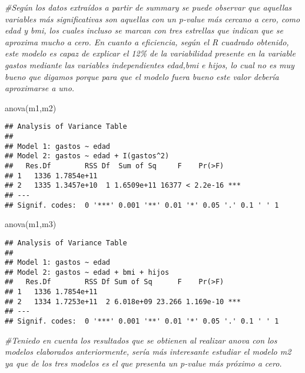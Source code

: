\documentclass[
]{book}
\newenvironment{Shaded}{\begin{snugshade}}{\end{snugshade}}
\newcommand{\CommentTok}[1]{\textcolor[rgb]{0.56,0.35,0.01}{\textit{#1}}}
\newcommand{\FunctionTok}[1]{\textcolor[rgb]{0.00,0.00,0.00}{#1}}
\newcommand{\NormalTok}[1]{#1}
\begin{document}
\begin{Shaded}
\begin{Highlighting}[]
\CommentTok{\#Según los datos extraídos a partir de summary se puede observar que aquellas variables más significativas son aquellas con un p{-}value más cercano a cero, como edad y bmi, los cuales incluso se marcan con tres estrellas que indican que se aproxima mucho a cero. En cuanto a eficiencia, según el R cuadrado obtenido, este modelo es capaz de explicar el 12\% de la variabilidad presente en la variable gastos mediante las variables independientes edad,bmi e hijos, lo cual no es muy bueno que digamos porque para que el modelo fuera bueno este valor debería aproximarse a uno.}
\end{Highlighting}
\end{Shaded}

\begin{Shaded}
\begin{Highlighting}[]
\FunctionTok{anova}\NormalTok{(m1,m2)}
\end{Highlighting}
\end{Shaded}

\begin{verbatim}
## Analysis of Variance Table
## 
## Model 1: gastos ~ edad
## Model 2: gastos ~ edad + I(gastos^2)
##   Res.Df        RSS Df  Sum of Sq     F    Pr(>F)    
## 1   1336 1.7854e+11                                  
## 2   1335 1.3457e+10  1 1.6509e+11 16377 < 2.2e-16 ***
## ---
## Signif. codes:  0 '***' 0.001 '**' 0.01 '*' 0.05 '.' 0.1 ' ' 1
\end{verbatim}

\begin{Shaded}
\begin{Highlighting}[]
\FunctionTok{anova}\NormalTok{(m1,m3)}
\end{Highlighting}
\end{Shaded}

\begin{verbatim}
## Analysis of Variance Table
## 
## Model 1: gastos ~ edad
## Model 2: gastos ~ edad + bmi + hijos
##   Res.Df        RSS Df Sum of Sq      F    Pr(>F)    
## 1   1336 1.7854e+11                                  
## 2   1334 1.7253e+11  2 6.018e+09 23.266 1.169e-10 ***
## ---
## Signif. codes:  0 '***' 0.001 '**' 0.01 '*' 0.05 '.' 0.1 ' ' 1
\end{verbatim}

\begin{Shaded}
\begin{Highlighting}[]
\CommentTok{\#Teniedo en cuenta los resultados que se obtienen al realizar anova con los modelos elaborados anteriormente, sería más interesante estudiar el modelo m2 ya que de los tres modelos es el que presenta un p{-}value más próximo a cero.}
\end{Highlighting}
\end{Shaded}
\end{document}
